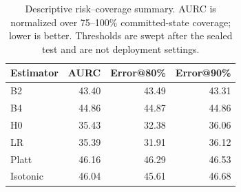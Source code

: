 \begin{table}[t]
\centering
\caption{Descriptive risk--coverage summary. AURC is normalized over 75--100\% committed-state coverage; lower is better. Thresholds are swept after the sealed test and are not deployment settings.}
\label{tab:aurc}
\begin{tabular}{lrrr}
\toprule
Estimator & AURC & Error@80\% & Error@90\% \\
\midrule
B2 & 43.40 & 43.49 & 43.31 \\
B4 & 44.86 & 44.87 & 44.86 \\
H0 & 35.43 & 32.38 & 36.06 \\
LR & 35.39 & 31.91 & 36.12 \\
Platt & 46.16 & 46.29 & 46.53 \\
Isotonic & 46.04 & 45.61 & 46.68 \\
\bottomrule
\end{tabular}
\end{table}
